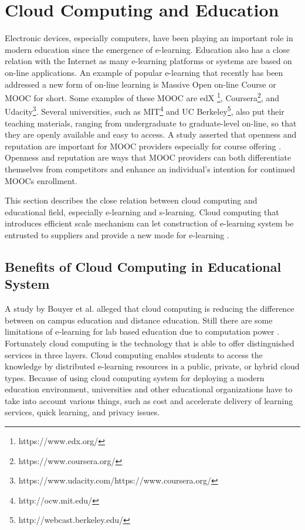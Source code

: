 \documentclass[journal]{vgtc}
\begin{document}
\section{Cloud Computing and Education}
Electronic devices, especially computers, have been playing an important role in modern education since the emergence of e-learning. Education also has a close relation with the Internet as many e-learning platforms or systems are based on on-line applications. An example of popular e-learning that recently has been addressed a new form of on-line learning is Massive Open on-line Course or MOOC for short\cite{Margaryan2014}. Some examples of these MOOC are edX \footnote{https://www.edx.org/}, Coursera\footnote{https://www.coursera.org/}, and Udacity\footnote{https://www.udacity.com/https://www.coursera.org/}. Several universities, such as MIT\footnote{http://ocw.mit.edu/} and UC Berkeley\footnote{http://webcast.berkeley.edu/}, also put their teaching materials, ranging from undergraduate to graduate-level on-line, so that they are openly available and easy to access. A study asserted that openness and reputation are important for MOOC providers especially for course offering \cite{Alraimi2014}. Openness and reputation are ways that MOOC providers can both differentiate themselves from competitors and enhance an individual's intention for continued MOOCs enrollment.

This section describes the close relation between cloud computing and educational field, especially e-learning and s-learning. Cloud computing that introduces efficient scale mechanism can let construction of e-learning system be entrusted to suppliers and provide a new mode for e-learning \cite{Laisheng2011}.

  \subsection{Benefits of Cloud Computing in Educational System}
  A study by Bouyer et al. \cite{Bouyer2014} alleged that cloud computing is reducing the difference between on campus education and distance education. Still there are some limitations of e-learning for lab based education due to computation power \cite{Bouyer2014}. Fortunately cloud computing is the technology that is able to offer distinguished services in three layers. Cloud computing enables students to access the knowledge by distributed e-learning resources in a public, private, or hybrid cloud types. Because of using cloud computing system for deploying a modern education environment, universities and other educational organizations have to take into account various things, such as cost and accelerate delivery of learning services, quick learning, and privacy issues.
\end{document}
